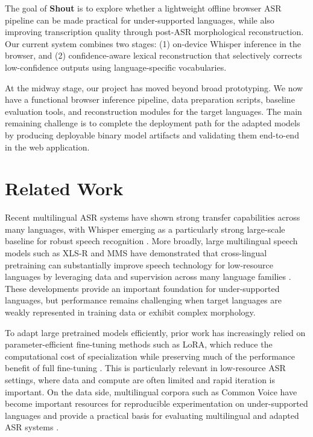 \documentclass[11pt]{article}
\begin{document}
The goal of \textbf{Shout} is to explore whether a lightweight offline browser ASR pipeline can be made practical for under-supported languages, while also improving transcription quality through post-ASR morphological reconstruction. Our current system combines two stages: (1) on-device Whisper inference in the browser, and (2) confidence-aware lexical reconstruction that selectively corrects low-confidence outputs using language-specific vocabularies.

At the midway stage, our project has moved beyond broad prototyping. We now have a functional browser inference pipeline, data preparation scripts, baseline evaluation tools, and reconstruction modules for the target languages. The main remaining challenge is to complete the deployment path for the adapted models by producing deployable binary model artifacts and validating them end-to-end in the web application.

\section{Related Work}
Recent multilingual ASR systems have shown strong transfer capabilities across many languages, with Whisper emerging as a particularly strong large-scale baseline for robust speech recognition \citep{radford2023robust}. More broadly, large multilingual speech models such as XLS-R and MMS have demonstrated that cross-lingual pretraining can substantially improve speech technology for low-resource languages by leveraging data and supervision across many language families \citep{babu2022xlsr,pratap2023mms}. These developments provide an important foundation for under-supported languages, but performance remains challenging when target languages are weakly represented in training data or exhibit complex morphology.

To adapt large pretrained models efficiently, prior work has increasingly relied on parameter-efficient fine-tuning methods such as LoRA, which reduce the computational cost of specialization while preserving much of the performance benefit of full fine-tuning \citep{hu2022lora}. This is particularly relevant in low-resource ASR settings, where data and compute are often limited and rapid iteration is important. On the data side, multilingual corpora such as Common Voice have become important resources for reproducible experimentation on under-supported languages and provide a practical basis for evaluating multilingual and adapted ASR systems \citep{ardila2020commonvoice}.
\end{document}

